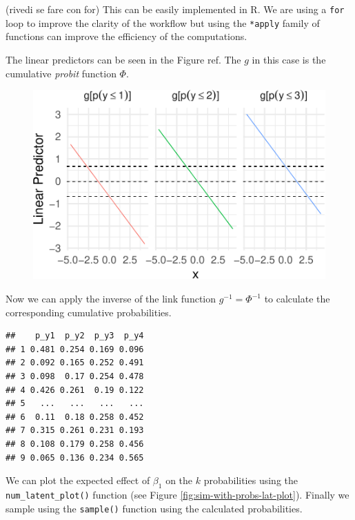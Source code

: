 \documentclass[
  man,floatsintext]{apa6}
\begin{document}
(rivedi se fare con for)
This can be easily implemented in R. We are using a \texttt{for} loop to improve the clarity of the workflow but using the \texttt{*apply} family of functions can improve the efficiency of the computations.

The linear predictors can be seen in the Figure ref. The \(g\) in this case is the cumulative \emph{probit} function \(\Phi\).

\begin{figure}

{\centering \includegraphics{paper-new_files/figure-latex/unnamed-chunk-11-1} 

}

\caption{ }\label{fig:unnamed-chunk-11}
\end{figure}

Now we can apply the inverse of the link function \(g^{-1} = \Phi^{-1}\) to calculate the corresponding cumulative probabilities.

\begin{verbatim}
##    p_y1  p_y2  p_y3  p_y4
## 1 0.481 0.254 0.169 0.096
## 2 0.092 0.165 0.252 0.491
## 3 0.098  0.17 0.254 0.478
## 4 0.426 0.261  0.19 0.122
## 5   ...   ...   ...   ...
## 6  0.11  0.18 0.258 0.452
## 7 0.315 0.261 0.231 0.193
## 8 0.108 0.179 0.258 0.456
## 9 0.065 0.136 0.234 0.565
\end{verbatim}

We can plot the expected effect of \(\beta_1\) on the \(k\) probabilities using the \texttt{num\_latent\_plot()} function (see Figure \ref{fig:sim-with-probs-lat-plot}). Finally we sample using the \texttt{sample()} function using the calculated probabilities.
\end{document}

